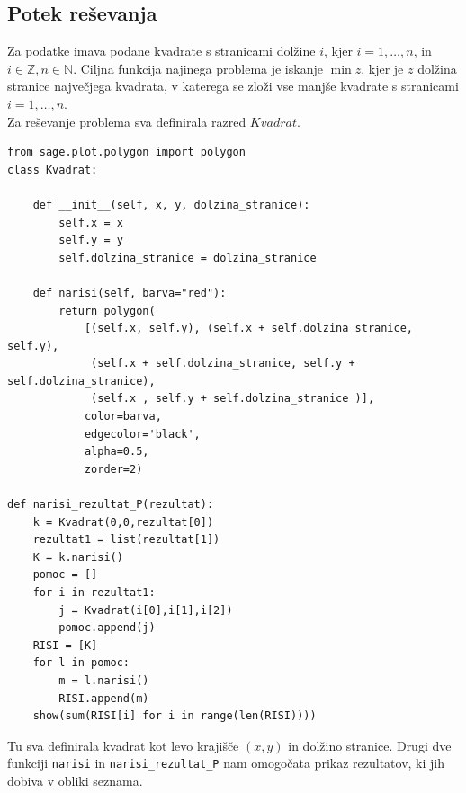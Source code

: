 \documentclass[a4paper, 11pt]{article}
\newcommand{\N}{\mathbb N}
\newcommand{\Z}{\mathbb Z}
\begin{document}
\subsection{Potek reševanja}\label{osnovna koda}
Za podatke imava podane kvadrate s stranicami dolžine $i$, kjer $i = 1, \dots , n$, in $ i \in \Z, n \in \N$.
Ciljna funkcija najinega problema je iskanje $\min z$, kjer je $z$ dolžina stranice največjega kvadrata, v katerega
se zloži vse manjše kvadrate s stranicami $i = 1, \dots , n$.\\
Za reševanje problema sva definirala razred $Kvadrat$.
\begin{verbatim}
from sage.plot.polygon import polygon
class Kvadrat:

    def __init__(self, x, y, dolzina_stranice):
        self.x = x
        self.y = y
        self.dolzina_stranice = dolzina_stranice

    def narisi(self, barva="red"):
        return polygon(
            [(self.x, self.y), (self.x + self.dolzina_stranice, self.y),
             (self.x + self.dolzina_stranice, self.y + self.dolzina_stranice),
             (self.x , self.y + self.dolzina_stranice )],
            color=barva,
            edgecolor='black',
            alpha=0.5,
            zorder=2)

def narisi_rezultat_P(rezultat):
    k = Kvadrat(0,0,rezultat[0])
    rezultat1 = list(rezultat[1])
    K = k.narisi()
    pomoc = []
    for i in rezultat1:
        j = Kvadrat(i[0],i[1],i[2])
        pomoc.append(j)
    RISI = [K]
    for l in pomoc:
        m = l.narisi()
        RISI.append(m)
    show(sum(RISI[i] for i in range(len(RISI))))
\end{verbatim}
Tu sva definirala kvadrat kot levo krajišče $(x,y)$ in dolžino stranice. Drugi dve funkciji
\texttt{narisi} in \verb|narisi_rezultat_P| nam omogočata prikaz rezultatov, ki jih dobiva v obliki seznama.
\end{document}
